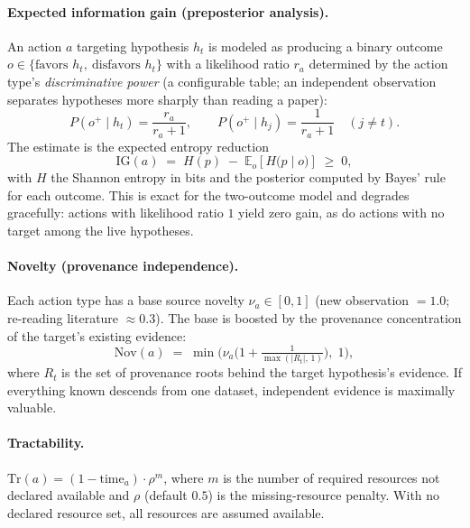 \documentclass[11pt]{article}
\newcommand{\IG}{\mathrm{IG}}
\newcommand{\Ent}{H}
\begin{document}
\paragraph{Expected information gain (preposterior analysis).}
An action $a$ targeting hypothesis $h_t$ is modeled as producing a binary
outcome $o \in \{\text{favors } h_t,\ \text{disfavors } h_t\}$ with a
likelihood ratio $r_a$ determined by the action type's
\emph{discriminative power} (a configurable table; an independent
observation separates hypotheses more sharply than reading a paper):
\begin{equation}
P(o^+ \mid h_t) = \frac{r_a}{r_a + 1}, \qquad
P(o^+ \mid h_j) = \frac{1}{r_a + 1} \quad (j \ne t).
\end{equation}
The estimate is the expected entropy reduction
\begin{equation}
\IG(a) \;=\; \Ent(p) \;-\; \mathbb{E}_{o}\!\left[\Ent\!\big(p \mid o\big)\right]
\;\ge\; 0,
\end{equation}
with $\Ent$ the Shannon entropy in bits and the posterior computed by
Bayes' rule for each outcome. This is exact for the two-outcome model and
degrades gracefully: actions with likelihood ratio $1$ yield zero gain,
as do actions with no target among the live hypotheses.

\paragraph{Novelty (provenance independence).}
Each action type has a base source novelty $\nu_a \in [0,1]$ (new
observation $=1.0$; re-reading literature $\approx 0.3$). The base is
boosted by the provenance concentration of the target's existing
evidence:
\begin{equation}
\mathrm{Nov}(a) \;=\; \min\!\Big(\nu_a \big(1 + \tfrac{1}{\max(|R_t|,\,1)}\big),\; 1\Big),
\end{equation}
where $R_t$ is the set of provenance roots behind the target hypothesis's
evidence. If everything known descends from one dataset, independent
evidence is maximally valuable.

\paragraph{Tractability.}
$\mathrm{Tr}(a) = (1 - \mathrm{time}_a) \cdot \rho^{m}$, where $m$ is the
number of required resources not declared available and $\rho$ (default
$0.5$) is the missing-resource penalty. With no declared resource set,
all resources are assumed available.
\end{document}
